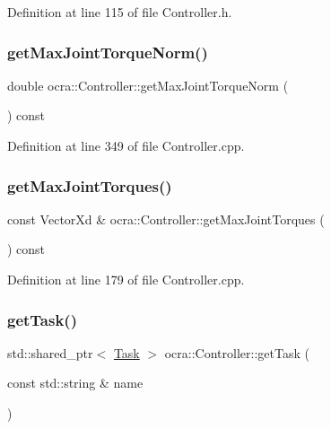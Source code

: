 Definition at line 115 of file Controller.\+h.

\hypertarget{classocra_1_1Controller_ac9a605bf14c4f70d3ba8d1c61f5c1976}{}\label{classocra_1_1Controller_ac9a605bf14c4f70d3ba8d1c61f5c1976} 
\subsubsection{\texorpdfstring{get\+Max\+Joint\+Torque\+Norm()}{getMaxJointTorqueNorm()}}
{\footnotesize\ttfamily double ocra\+::\+Controller\+::get\+Max\+Joint\+Torque\+Norm (\begin{DoxyParamCaption}{ }\end{DoxyParamCaption}) const}



Definition at line 349 of file Controller.\+cpp.

\hypertarget{classocra_1_1Controller_a237b064c384ee45ff0a9152526c8818c}{}\label{classocra_1_1Controller_a237b064c384ee45ff0a9152526c8818c} 
\subsubsection{\texorpdfstring{get\+Max\+Joint\+Torques()}{getMaxJointTorques()}}
{\footnotesize\ttfamily const Vector\+Xd \& ocra\+::\+Controller\+::get\+Max\+Joint\+Torques (\begin{DoxyParamCaption}{ }\end{DoxyParamCaption}) const}



Definition at line 179 of file Controller.\+cpp.

\hypertarget{classocra_1_1Controller_ab5ffcbcc07bf4191d38b75ef10214acb}{}\label{classocra_1_1Controller_ab5ffcbcc07bf4191d38b75ef10214acb} 
\subsubsection{\texorpdfstring{get\+Task()}{getTask()}\hspace{0.1cm}{\footnotesize\ttfamily [1/2]}}
{\footnotesize\ttfamily std\+::shared\+\_\+ptr$<$ \hyperlink{classocra_1_1Task}{Task} $>$ ocra\+::\+Controller\+::get\+Task (\begin{DoxyParamCaption}\item[{const std\+::string \&}]{name }\end{DoxyParamCaption})}




